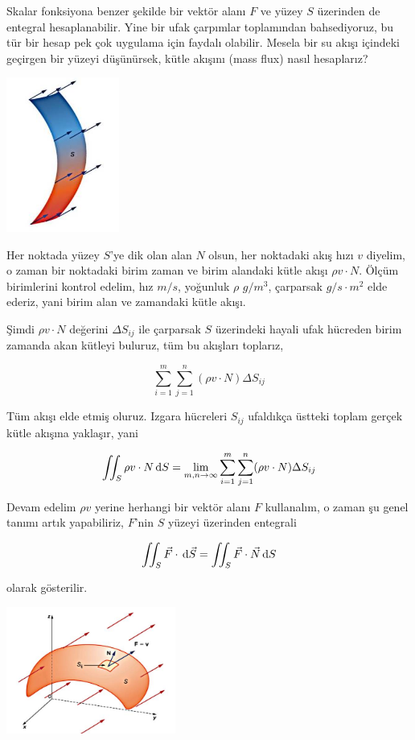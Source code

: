\documentclass[12pt,fleqn]{article}\usepackage{../../common}
\begin{document}
Skalar fonksiyona benzer şekilde bir vektör alanı $F$ ve yüzey $S$ üzerinden de
entegral hesaplanabilir. Yine bir ufak çarpımlar toplamından bahsediyoruz, bu
tür bir hesap pek çok uygulama için faydalı olabilir. Mesela bir su akışı
içindeki geçirgen bir yüzeyi düşünürsek, kütle akışını (mass flux) nasıl
hesaplarız? 

\includegraphics[width=10em]{calc_multi_75_app_04.jpg}

Her noktada yüzey $S$'ye dik olan alan $N$ olsun, her noktadaki akış hızı $v$
diyelim, o zaman bir noktadaki birim zaman ve birim alandaki kütle akışı $\rho v
\cdot N$. Ölçüm birimlerini kontrol edelim, hız $m/s$, yoğunluk $\rho$ 
$g/m^3$, çarparsak $g/s \cdot m^2$ elde ederiz, yani birim alan ve zamandaki
kütle akışı.

Şimdi $\rho v \cdot N$ değerini $\Delta S_{ij}$ ile çarparsak $S$ üzerindeki
hayali ufak hücreden birim zamanda akan kütleyi buluruz, tüm bu akışları
toplarız,

$$
\sum_{i=1}^{m} \sum_{j=1}^{n} (\rho v \cdot N) \Delta S_{ij}
$$

Tüm akışı elde etmiş oluruz. Izgara hücreleri $S_{ij}$ ufaldıkça üstteki toplam
gerçek kütle akışına yaklaşır, yani

$$
\iint_S \rho v \cdot N \,\mathrm{d} S = \lim_{m,n \to \infty}
\sum_{i=1}^{m} \sum_{j=1}^{n} (\rho v \cdot N) \Delta S_{ij}
$$

Devam edelim $\rho v$ yerine herhangi bir vektör alanı $F$ kullanalım, o zaman
şu genel tanımı artık yapabiliriz, $F$'nin $S$ yüzeyi üzerinden entegrali

$$
\iint_S \vec{F} \cdot \,\mathrm{d} \vec{S} = \iint_S \vec{F} \cdot \vec{N} \,\mathrm{d} S
$$

olarak gösterilir.

\includegraphics[width=15em]{calc_multi_75_app_05.jpg}
\end{document}
